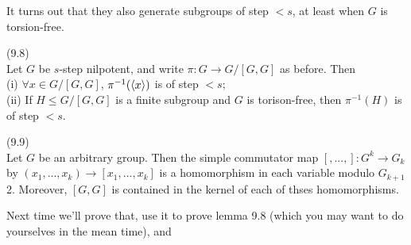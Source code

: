 \documentclass[a4paper]{article}
\begin{document}
It turns out that they also generate subgroups of step $<s$, at least when $G$ is torsion-free.

\begin{lemma} (9.8)\\
Let $G$ be $s$-step nilpotent, and write $\pi:G \to G/[G,G]$ as before. Then\\
(i) $\forall x \in G/[G,G]$, $\pi^{-1}(\langle x\rangle)$ is of step $<s$;\\
(ii) If $H \leq G/[G,G]$ is a finite subgroup and $G$ is torison-free, then $\pi^{-1}(H)$ is of step $<s$.
\end{lemma}

\begin{lemma} (9.9)\\
Let $G$ be an arbitrary group. Then the simple commutator map $[,...,]:G^k \to G_k$ by $(x_1,...,x_k) \to [x_1,...,x_k]$ is a homomorphism in each variable modulo $G_{k+1}$2. Moreover, $[G,G]$ is contained in the kernel of each of thses homomorphisms.
\end{lemma}

Next time we'll prove that, use it to prove lemma 9.8 (which you may want to do yourselves in the mean time), and 
\end{document}
